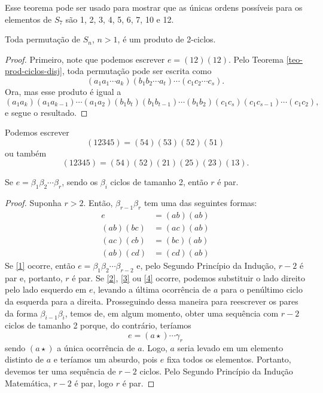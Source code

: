     \begin{example}
        Esse teorema pode ser usado para mostrar que as únicas ordens possíveis para os elementos de
        $S_7$ são 1, 2, 3, 4, 5, 6, 7, 10 e 12.
    \end{example}
    \begin{theorem}
    \label{teo-perm-2ciclos}
        Toda permutação de $S_n$, $n>1$, é um produto de 2-ciclos.
    \end{theorem}
    \begin{proof}
        Primeiro, note que podemos escrever $e = (12)(12)$. Pelo Teorema \ref{teo-prod-ciclos-disj}, toda
        permutação pode ser escrita como
        \[
        (a_1a_1\cdots a_k)(b_1b_2\cdots a_t)\cdots(c_1c_2\cdots c_s).
        \]
        Ora, mas esse produto é igual a
        \[
        (a_1a_k)(a_1a_{k-1})\cdots(a_1a_2)(b_1b_t)(b_1b_{t-1})\cdots(b_1b_2)(c_1c_s)(c_1c_{s-1})\cdots (c_1c_2),
        \]
        e segue o resultado.
    \end{proof}
    \begin{example}
        Podemos escrever
        \[
        (12345) = (54)(53)(52)(51)
        \]
        ou também
        \[
        (12345) = (54)(52)(21)(25)(23)(13).
        \]
    \end{example}
    \begin{lemma}
	\label{lema identidade permutacoes}
        Se $e = \beta_{1}\beta_{2}\cdots\beta_{r}$, sendo os $\beta_i$
        ciclos de tamanho 2, então $r$ é par.
	\end{lemma}
	\begin{proof}
		Suponha $r>2$. Então, $\beta_{r-1}\beta_{r}$ tem uma das
		seguintes formas:
		\begin{align}
		    \label{1} e &= (ab)(ab) \\
		    \label{2} (ab)(bc) &= (ac)(ab) \\
		    \label{3} (ac)(cb) &= (bc)(ab) \\
		    \label{4} (ab)(cd) &= (cd)(ab)
		\end{align}
		Se \eqref{1} ocorre, então 
		$e = \beta_{1}\beta_{2}\cdots\beta_{r-2}$ e, pelo 
		Segundo Princípio da Indução, $r-2$ é par e, portanto, 
		$r$ é par. Se \eqref{2}, \eqref{3} ou \eqref{4} ocorre,
		podemos substituir o lado direito pelo lado esquerdo em
		$e$, levando a última ocorrência de $a$ para o penúltimo
		ciclo da esquerda para a direita. Prosseguindo dessa
		maneira para reescrever os pares da forma
		$\beta_{i-1}\beta_{i}$, temos de, em algum momento, 
		obter uma sequência com $r-2$ ciclos de tamanho 2 
		porque, do contrário, teríamos
		\begin{equation*}
		    e = (a \star)\cdots\gamma_{r}
		\end{equation*}
		sendo $(a\star)$ a única ocorrência de $a$. Logo, 
		$a$ seria levado em um elemento distinto de $a$ e 
		teríamos um absurdo, pois $e$ fixa todos os elementos.
		Portanto, devemos ter uma sequência de $r-2$ ciclos. 
		Pelo Segundo Princípio da Indução Matemática, 
		$r-2$ é par, logo $r$ é par.
	\end{proof}
